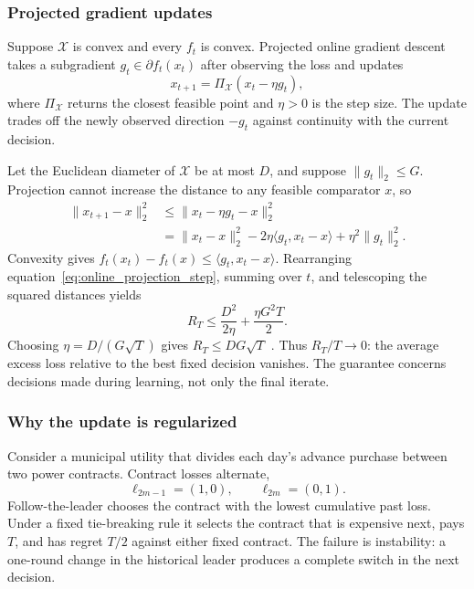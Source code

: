 \subsubsection{Projected gradient updates}

Suppose $\mathcal X$ is convex and every $f_t$ is convex. Projected online gradient descent takes a subgradient $g_t\in\partial f_t(x_t)$ after observing the loss and updates
\begin{equation}
x_{t+1}
=
\Pi_{\mathcal X}(x_t-\eta g_t),
\label{eq:online_projected_gradient}
\end{equation}
where $\Pi_{\mathcal X}$ returns the closest feasible point and $\eta>0$ is the step size. The update trades off the newly observed direction $-g_t$ against continuity with the current decision.

Let the Euclidean diameter of $\mathcal X$ be at most $D$, and suppose $\lVert g_t\rVert_2\leq G$. Projection cannot increase the distance to any feasible comparator $x$, so
\begin{align}
\lVert x_{t+1}-x\rVert_2^2
&\leq
\lVert x_t-\eta g_t-x\rVert_2^2 \nonumber\\
&=
\lVert x_t-x\rVert_2^2
-2\eta\langle g_t,x_t-x\rangle
+\eta^2\lVert g_t\rVert_2^2.
\label{eq:online_projection_step}
\end{align}
Convexity gives $f_t(x_t)-f_t(x)\leq\langle g_t,x_t-x\rangle$. Rearranging equation~\eqref{eq:online_projection_step}, summing over $t$, and telescoping the squared distances yields
\begin{equation}
R_T
\leq
\frac{D^2}{2\eta}
+
\frac{\eta G^2T}{2}.
\label{eq:online_ogd_bound}
\end{equation}
Choosing $\eta=D/(G\sqrt T)$ gives $R_T\leq DG\sqrt T$ \citep{zinkevich2003online}. Thus $R_T/T\to0$: the average excess loss relative to the best fixed decision vanishes. The guarantee concerns decisions made during learning, not only the final iterate.

\subsubsection{Why the update is regularized}

Consider a municipal utility that divides each day's advance purchase between two power contracts. Contract losses alternate,
\begin{equation}
\ell_{2m-1}=(1,0),
\qquad
\ell_{2m}=(0,1).
\label{eq:power_alternating_losses}
\end{equation}
Follow-the-leader chooses the contract with the lowest cumulative past loss. Under a fixed tie-breaking rule it selects the contract that is expensive next, pays $T$, and has regret $T/2$ against either fixed contract. The failure is instability: a one-round change in the historical leader produces a complete switch in the next decision.

